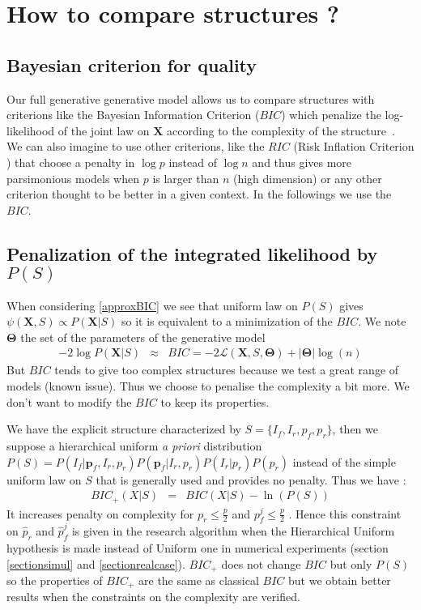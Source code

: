 \documentclass[12pt,a4paper]{report}
\begin{document}
	\section{How to compare structures ?}
		\subsection{Bayesian criterion for quality}
		Our full generative generative model allows us to compare structures with criterions like the Bayesian Information Criterion ($BIC$) which penalize the log-likelihood of the joint law on $\boldsymbol{X}$ according to the complexity of the structure~\cite{BIChuard}. \\
			 We can also imagine to use other criterions, like the $RIC$ (Risk Inflation Criterion \cite{foster1994risk}) that choose a penalty in $\log p$ instead of $\log n$ and thus gives more parsimonious models when $p$ is larger than $n$ (high dimension) or any other criterion \cite{george1993variable} thought to be better in a given context.
		In the followings we use the $BIC$.	
		\subsection{Penalization of the integrated likelihood by $P(S)$} \label{compstruct}
When considering \ref{approxBIC} we see that uniform law on $P(S)$ gives $\psi(\boldsymbol{X},S)\propto P(\boldsymbol{X}|S)$ so it is equivalent to a minimization of the $BIC$.
	We note $\boldsymbol{\Theta}$ the set of the parameters of the generative model
	\begin{eqnarray}
		-2\log P(\boldsymbol{X}|S)&\approx & BIC=-2\mathcal{L}(\boldsymbol{X},S,\boldsymbol{\Theta})+|\boldsymbol{\Theta}|\log(n)  
	\end{eqnarray}
	But $BIC$ tends to give too complex structures because we test a great range of models (known issue). Thus we choose to penalise the complexity a bit more. We don't want to modify the $BIC$ to keep its properties.
	

We have the explicit structure characterized by $S=\{I_f,I_r,p_f,p_r\}$, then we suppose a hierarchical uniform {\it a priori} distribution $P(S)=P(I_f | \boldsymbol{p}_f,I_r,p_r)P(\boldsymbol{p}_f|I_r,p_r)P(I_r|p_r)P(p_r)$  instead of the simple uniform law on $S$ that is generally used and provides no penalty.
	 Thus we have :
		\begin{eqnarray}
		BIC_+(X|S)&=&BIC(X|S) -\ln(P(S)) \label{Bicstar}
	\end{eqnarray}		
	It increases penalty on complexity for $p_r\leq\frac{p}{2}$ and $p_f^j\leq\frac{p}{2}$ . Hence %
	this constraint on $\hat{p}_r$ and $\hat{p}_f^j$ is given in the research algorithm when the Hierarchical Uniform hypothesis is made instead of Uniform one in numerical experiments (section \ref{sectionsimul} and \ref{sectionrealcase}).
		$BIC_+$ does not change $BIC$ but only $P(S)$ so the properties of $BIC_+$ are the same as classical $BIC$ but we obtain better results when the constraints on the complexity are verified.  %
\end{document}
